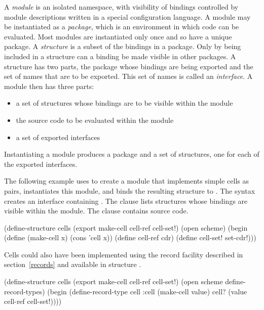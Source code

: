 
A {\em module} is an isolated namespace, with visibility of bindings
 controlled by module descriptions written in a special
 configuration language.
A module may be instantiated as a {\em package}, which is an environment
 in which code can be evaluated.
Most modules are instantiated only once and so have a unique package.
A {\em structure} is a subset of the bindings in a package.
Only by being included in a structure can a binding be
 made visible in other packages.
A structure has two parts, the package whose bindings are being exported
 and the set of names that are to be exported.
This set of names is called an {\em interface}.
A module then has three parts:
\begin{itemize}
\item a set of structures whose bindings are to be visible within the module
\item the source code to be evaluated within the module
\item a set of exported interfaces
\end{itemize}
Instantiating a module produces a package and a set of structures, one for
 each of the exported interfaces.

The following example uses  to create a module that
 implements simple cells as pairs, instantiates this module, and binds the
 resulting structure to .
The syntax  creates an interface
 containing .
The  clause lists structures whose bindings are visible
 within the module.
The  clause contains source code.
\begin{example}
(define-structure cells (export make-cell
                                cell-ref
                                cell-set!)
  (open scheme)
  (begin (define (make-cell x)
           (cons 'cell x))
         (define cell-ref cdr)
         (define cell-set! set-cdr!)))
\end{example}

Cells could also have been implemented using the
record facility described in section~\ref{records}
 and available in structure .
\begin{example}
(define-structure cells (export make-cell
                                cell-ref
                                cell-set!)
  (open scheme define-record-types)
  (begin (define-record-type cell :cell
           (make-cell value)
           cell?
           (value cell-ref cell-set!))))
\end{example}

